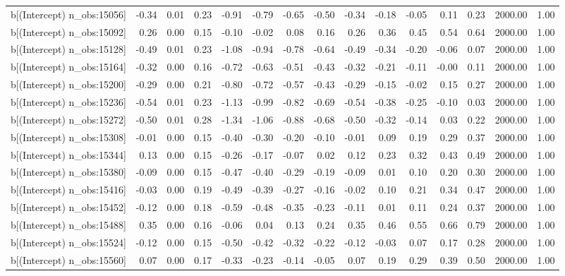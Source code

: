 \begin{table}[ht]
\begin{tabular}{rrrrrrrrrrrrrrr}
  b[(Intercept) n\_obs:15056] & -0.34 & 0.01 & 0.23 & -0.91 & -0.79 & -0.65 & -0.50 & -0.34 & -0.18 & -0.05 & 0.11 & 0.23 & 2000.00 & 1.00 \\ 
  b[(Intercept) n\_obs:15092] & 0.26 & 0.00 & 0.15 & -0.10 & -0.02 & 0.08 & 0.16 & 0.26 & 0.36 & 0.45 & 0.54 & 0.64 & 2000.00 & 1.00 \\ 
  b[(Intercept) n\_obs:15128] & -0.49 & 0.01 & 0.23 & -1.08 & -0.94 & -0.78 & -0.64 & -0.49 & -0.34 & -0.20 & -0.06 & 0.07 & 2000.00 & 1.00 \\ 
  b[(Intercept) n\_obs:15164] & -0.32 & 0.00 & 0.16 & -0.72 & -0.63 & -0.51 & -0.43 & -0.32 & -0.21 & -0.11 & -0.00 & 0.11 & 2000.00 & 1.00 \\ 
  b[(Intercept) n\_obs:15200] & -0.29 & 0.00 & 0.21 & -0.80 & -0.72 & -0.57 & -0.43 & -0.29 & -0.15 & -0.02 & 0.15 & 0.27 & 2000.00 & 1.00 \\ 
  b[(Intercept) n\_obs:15236] & -0.54 & 0.01 & 0.23 & -1.13 & -0.99 & -0.82 & -0.69 & -0.54 & -0.38 & -0.25 & -0.10 & 0.03 & 2000.00 & 1.00 \\ 
  b[(Intercept) n\_obs:15272] & -0.50 & 0.01 & 0.28 & -1.34 & -1.06 & -0.88 & -0.68 & -0.50 & -0.32 & -0.14 & 0.03 & 0.22 & 2000.00 & 1.00 \\ 
  b[(Intercept) n\_obs:15308] & -0.01 & 0.00 & 0.15 & -0.40 & -0.30 & -0.20 & -0.10 & -0.01 & 0.09 & 0.19 & 0.29 & 0.37 & 2000.00 & 1.00 \\ 
  b[(Intercept) n\_obs:15344] & 0.13 & 0.00 & 0.15 & -0.26 & -0.17 & -0.07 & 0.02 & 0.12 & 0.23 & 0.32 & 0.43 & 0.49 & 2000.00 & 1.00 \\ 
  b[(Intercept) n\_obs:15380] & -0.09 & 0.00 & 0.15 & -0.47 & -0.40 & -0.29 & -0.19 & -0.09 & 0.01 & 0.10 & 0.20 & 0.30 & 2000.00 & 1.00 \\ 
  b[(Intercept) n\_obs:15416] & -0.03 & 0.00 & 0.19 & -0.49 & -0.39 & -0.27 & -0.16 & -0.02 & 0.10 & 0.21 & 0.34 & 0.47 & 2000.00 & 1.00 \\ 
  b[(Intercept) n\_obs:15452] & -0.12 & 0.00 & 0.18 & -0.59 & -0.48 & -0.35 & -0.23 & -0.11 & 0.01 & 0.11 & 0.24 & 0.37 & 2000.00 & 1.00 \\ 
  b[(Intercept) n\_obs:15488] & 0.35 & 0.00 & 0.16 & -0.06 & 0.04 & 0.13 & 0.24 & 0.35 & 0.46 & 0.55 & 0.66 & 0.79 & 2000.00 & 1.00 \\ 
  b[(Intercept) n\_obs:15524] & -0.12 & 0.00 & 0.15 & -0.50 & -0.42 & -0.32 & -0.22 & -0.12 & -0.03 & 0.07 & 0.17 & 0.28 & 2000.00 & 1.00 \\ 
  b[(Intercept) n\_obs:15560] & 0.07 & 0.00 & 0.17 & -0.33 & -0.23 & -0.14 & -0.05 & 0.07 & 0.19 & 0.29 & 0.39 & 0.50 & 2000.00 & 1.00 \\ 

\end{tabular}
\end{table}
